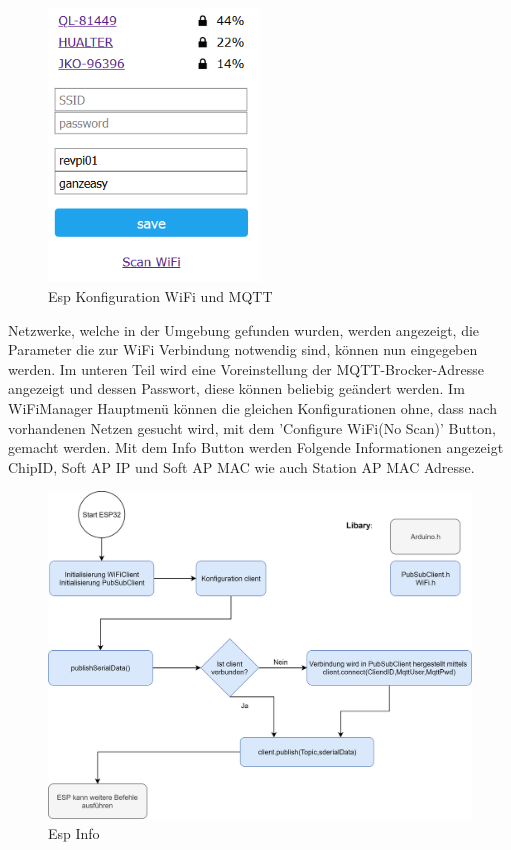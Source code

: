 \begin{figure}[H]
	\centering
	\includegraphics[width=0.5\textwidth]{graphics/WifiKonfig.png}
	\caption{Esp Konfiguration WiFi und MQTT}
	\label{pic: wifiKonfig}
\end{figure}   

Netzwerke, welche in der Umgebung gefunden wurden, werden angezeigt, die Parameter die zur WiFi Verbindung notwendig sind, können nun eingegeben werden. Im unteren Teil wird eine Voreinstellung der MQTT-Brocker-Adresse angezeigt und dessen Passwort, diese können beliebig geändert werden. Im WiFiManager Hauptmenü können die gleichen Konfigurationen ohne, dass nach vorhandenen Netzen gesucht wird, mit dem 'Configure WiFi(No Scan)' Button, gemacht werden. Mit dem Info Button werden Folgende Informationen angezeigt ChipID, Soft AP IP und Soft AP MAC wie auch Station AP MAC Adresse.

\begin{figure}[H]
	\centering
	\includegraphics[width=\textwidth]{graphics/MQTTSubPubClient.png}
	\caption{Esp Info}
	\label{pic: SubPubClient}
\end{figure}   

